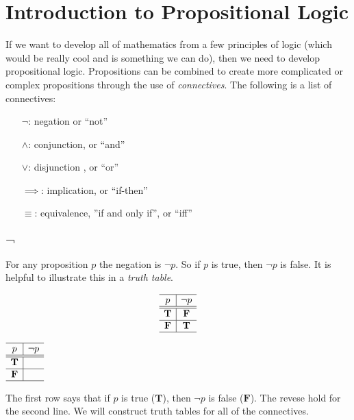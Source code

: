 \section{Introduction to Propositional Logic}
If we want to develop all of mathematics from a few principles of logic (which would be really cool and is something we can do), then we need to develop propositional logic.  Propositions  can be combined to create more complicated or complex propositions through the use of \emph{connectives}.  The following is a list of connectives:
\begin{enumerate}
\item [$\neg$:]negation or ``not''
\item [$\land$:]conjunction, or ``and''
\item [$\lor$:]disjunction , or ``or''
\item [$\implies$:] implication, or ``if-then''
\item [$\equiv$:] equivalence, ''if and only if'', or ``iff''
\end{enumerate}

\subsection*{\Huge$\neg$}
For any proposition $p$ the negation is $\neg p$.  So if $p$ is true, then $\neg p$ is false.  It is helpful to illustrate this in a \emph{truth table}.  


\[  \begin{array}{c|c}
  \hline  
  p & \neg p\\
  \hline
  \hline
 \mathbf{T} &  \mathbf{F}\\
  \hline
     \mathbf{F}&  \mathbf{T}\\
    \hline
    \end{array}\]
    
 \ifKey
\color{red}
\hfill 
 $ \begin{array}{c|c}
  \hline  
  p & \neg p\\
  \hline
  \hline
 \mathbf{T} &  \\
  \hline
     \mathbf{F}& \\
    \hline
    \end{array}
 $
    \color{black}
\fi
    

    
The first row says that if $p$ is true ($\mathbf{T}$), then $\neg p$ is false ($\mathbf{F}$).  The revese hold for the second line.  We will construct truth tables for all of the connectives.

